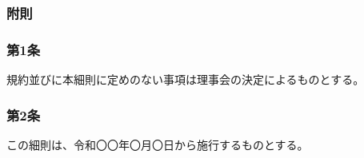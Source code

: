 \documentclass[12pt,uplatex]{jsarticle}
\begin{document}
\begin{center}
\subsubsection*{附則}
\end{center}
\subsubsection*{第1条}
規約並びに本細則に定めのない事項は理事会の決定によるものとする。
\subsubsection*{第2条}
この細則は、令和〇〇年〇月〇日から施行するものとする。
\end{document}
